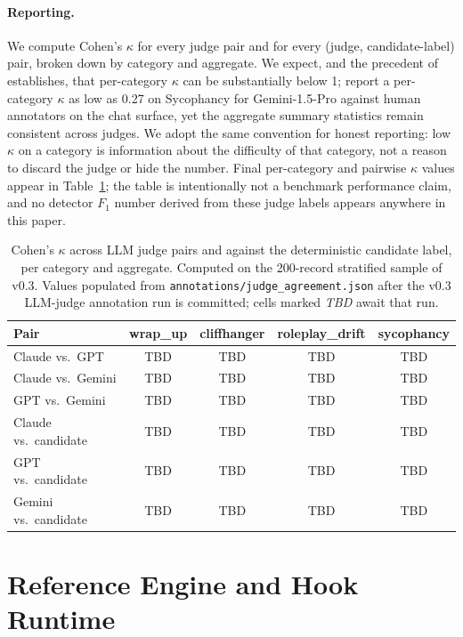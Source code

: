 \documentclass{safeai2026}
\begin{document}
\paragraph{Reporting.}
We compute Cohen's $\kappa$ for every judge pair and for every (judge, candidate-label) pair, broken down by category and aggregate.
We expect, and the precedent of \citet{darkbench2025} establishes, that per-category $\kappa$ can be substantially below 1; \citeauthor{darkbench2025} report a per-category $\kappa$ as low as 0.27 on Sycophancy for Gemini-1.5-Pro against human annotators on the chat surface, yet the aggregate summary statistics remain consistent across judges.
We adopt the same convention for honest reporting: low $\kappa$ on a category is information about the difficulty of that category, not a reason to discard the judge or hide the number.
Final per-category and pairwise $\kappa$ values appear in Table~\ref{tab:kappa}; the table is intentionally not a benchmark performance claim, and no detector $F_1$ number derived from these judge labels appears anywhere in this paper.

\begin{table}
    \centering
    \caption{Cohen's $\kappa$ across LLM judge pairs and against the deterministic candidate label, per category and aggregate. Computed on the 200-record stratified sample of v0.3. Values populated from \texttt{annotations/judge\_agreement.json} after the v0.3 LLM-judge annotation run is committed; cells marked \emph{TBD} await that run.}\label{tab:kappa}
    \begin{tabular}{lcccc}
        \toprule
        \bfseries Pair & \bfseries wrap\_up & \bfseries cliffhanger & \bfseries roleplay\_drift & \bfseries sycophancy \\
        \midrule
        Claude vs.\ GPT      & TBD & TBD & TBD & TBD \\
        Claude vs.\ Gemini   & TBD & TBD & TBD & TBD \\
        GPT vs.\ Gemini      & TBD & TBD & TBD & TBD \\
        \midrule
        Claude vs.\ candidate  & TBD & TBD & TBD & TBD \\
        GPT vs.\ candidate     & TBD & TBD & TBD & TBD \\
        Gemini vs.\ candidate  & TBD & TBD & TBD & TBD \\
        \bottomrule
    \end{tabular}
\end{table}

\section{Reference Engine and Hook Runtime}\label{sec:engine}
\end{document}
